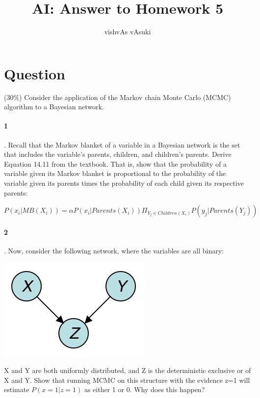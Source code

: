 \documentclass[10pt]{article}
\title{AI: Answer to Homework 5}
\author{vishvAs vAsuki}
\begin{document}
\maketitle

\section{Question}

  (30\%) Consider the application of the Markov chain Monte Carlo (MCMC) algorithm to a Bayesian network.

   \paragraph{1}. Recall that the Markov blanket of a variable in a Bayesian network is the set that includes the variable's parents, children, and children's parents. Derive Equation 14.11 from the textbook. That is, show that the probability of a variable given its Markov blanket is proportional to the probability of the variable given its parents times the probability of each child given its respective parents:

$P(x_{i}|MB(X_{i}))=\alpha P(x_{i}|Parents(X_{i}))\Pi_{Y_{j}\in Children(X_{i})} P(y_{j}|Parents(Y_{j}))$

   \paragraph{2}. Now, consider the following network, where the variables are all binary:
\begin{center}
 \includegraphics[scale=0.5]{hw5_files/fig5x1b.jpg}
\end{center}

      X and Y are both uniformly distributed, and Z is the deterministic exclusive or of X and Y. Show that running MCMC on this structure with the evidence z=1 will estimate $P(x=1|z=1)$ as either 1 or 0. Why does this happen?
\end{document}
